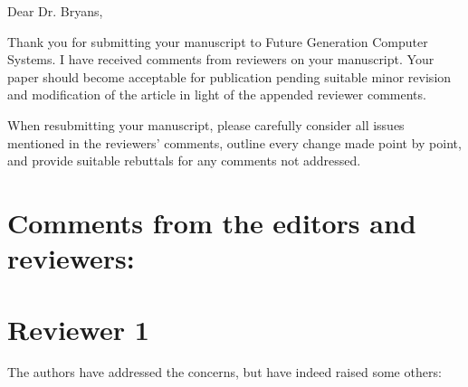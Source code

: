 \documentclass{article}
\begin{document}
Dear Dr. Bryans,

Thank you for submitting your manuscript to Future Generation Computer Systems. I have received comments from reviewers on your manuscript. Your paper should become acceptable for publication pending suitable minor revision and modification of the article in light of the appended reviewer comments.

When resubmitting your manuscript, please carefully consider all issues mentioned in the reviewers' comments, outline every change made point by point, and provide suitable rebuttals for any comments not addressed.


\section*{Comments from the editors and reviewers:}
\section*{Reviewer 1}

The authors have addressed the concerns, but have indeed raised some others:
\end{document}
